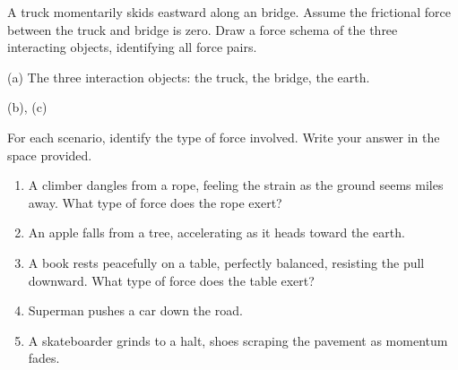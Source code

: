 \documentclass[answers]{exam}
\begin{document}
\begin{questions}
\question[3]
A truck momentarily skids eastward along an bridge. Assume the frictional force between the truck and bridge is zero. Draw a force schema of the three interacting objects, identifying all force pairs. 

\begin{solutionorbox}[10cm]
(a) The three interaction objects: the truck, the bridge, the earth.

(b), (c)

\begin{center}
\end{center}    
\end{solutionorbox}

\clearpage
\question[5]
For each scenario, identify the type of force involved. Write your answer in the space provided.

\begin{enumerate} %
    \item A climber dangles from a rope, feeling the strain as the ground seems miles away. What type of force does the rope exert? \\[1ex]
    \item An apple falls from a tree, accelerating as it heads toward the earth. \\[1ex]
    \fillin[gravity][5cm]
    \item A book rests peacefully on a table, perfectly balanced, resisting the pull downward. What type of force does the table exert? \\[1ex]
    \item Superman pushes a car down the road. \\[1ex]
    \item A skateboarder grinds to a halt, shoes scraping the pavement as momentum fades.\\[1ex]
\end{enumerate}


\end{questions}
\end{document}
